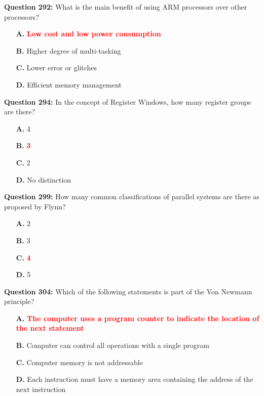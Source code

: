 \documentclass[12pt,a4paper]{article}
\begin{document}
\vspace{0.5cm}

\textbf{Question 292:} What is the main benefit of using ARM processors over other processors?

\begin{itemize}
    \item[\textbf{A.}] \textcolor{red}{\textbf{Low cost and low power consumption}}
    \item[\textbf{B.}] Higher degree of multi-tasking
    \item[\textbf{C.}] Lower error or glitches
    \item[\textbf{D.}] Efficient memory management
\end{itemize}

\vspace{0.5cm}

\textbf{Question 294:} In the concept of Register Windows, how many register groups are there?

\begin{itemize}
    \item[\textbf{A.}] 4
    \item[\textbf{B.}] \textcolor{red}{\textbf{3}}
    \item[\textbf{C.}] 2
    \item[\textbf{D.}] No distinction
\end{itemize}

\vspace{0.5cm}

\textbf{Question 299:} How many common classifications of parallel systems are there as proposed by Flynn?

\begin{itemize}
    \item[\textbf{A.}] 2
    \item[\textbf{B.}] 3
    \item[\textbf{C.}] \textcolor{red}{\textbf{4}}
    \item[\textbf{D.}] 5
\end{itemize}

\vspace{0.5cm}

\textbf{Question 304:} Which of the following statements is part of the Von Newmann principle?

\begin{itemize}
    \item[\textbf{A.}] \textcolor{red}{\textbf{The computer uses a program counter to indicate the location of the next statement}}
    \item[\textbf{B.}] Computer can control all operations with a single program
    \item[\textbf{C.}] Computer memory is not addressable
    \item[\textbf{D.}] Each instruction must have a memory area containing the address of the next instruction
\end{itemize}
\end{document}
